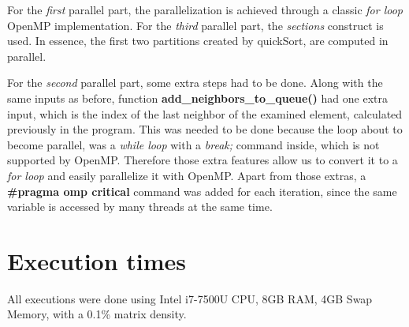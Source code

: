\documentclass[letterpaper,12pt]{article}
\begin{document}
For the \textit{first} parallel part, the parallelization is achieved through a classic \textit{for loop} OpenMP implementation. For the \textit{third} parallel part, the \textit{sections} construct is used. In essence, the first two partitions created by quickSort, are computed in parallel.

For the \textit{second} parallel part, some extra steps had to be done. Along with the same inputs as before, function \textbf{add\_neighbors\_to\_queue()} had one extra input, which is the index of the last neighbor of the examined element, calculated previously in the program. This was needed to be done because the loop about to become parallel, was a \textit{while loop} with a \textit{break;} command inside, which is not supported by OpenMP. Therefore those extra features allow us to convert it to a \textit{for loop} and easily parallelize it with OpenMP. Apart from those extras, a \textbf{\#pragma omp critical} command was added for each iteration, since the same variable is accessed by many threads at the same time.


\section{Execution times}

All executions were done using Intel i7-7500U CPU, 8GB RAM, 4GB Swap Memory, with a 0.1\% matrix density.
\end{document}
